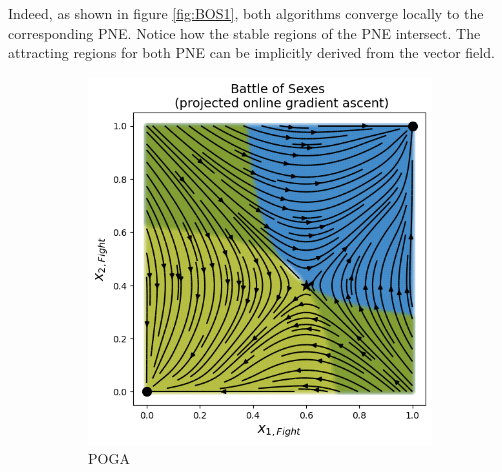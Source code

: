 Indeed, as shown in figure \ref{fig:BOS1}, both algorithms converge locally to the corresponding PNE. Notice how the stable regions of the PNE intersect. The attracting regions for both PNE can be implicitly derived from the vector field.


\begin{figure}[H]
\centering
\begin{subfigure}{.5\textwidth}
    \centering
    \includegraphics[width=\textwidth]{logos/BattleOfSexes1.png}
    \caption{POGA}
\end{subfigure}%
\begin{subfigure}{.5\textwidth}
    \centering

\end{subfigure}
\end{figure}
